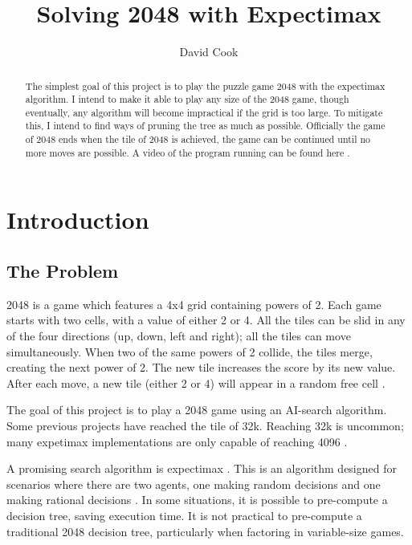 \documentclass{article}
\title{Solving 2048 with Expectimax}
\author{David Cook}
\begin{document}
\maketitle

\tableofcontents
\newpage
\begin{abstract}
The simplest goal of this project is to play the puzzle game 2048 with the expectimax algorithm. I intend to make it able to play any size of the 2048 game, though eventually, any algorithm will become impractical if the grid is too large. To mitigate this, I intend to find ways of pruning the tree as much as possible. Officially the game of 2048 ends when the tile of 2048 is achieved, the game can be continued until no more moves are possible.
A video of the program running can be found here \cite{video}.
\end{abstract}
\section{Introduction}
\label{sec:intro}
\subsection{The Problem}
\label{subsec:problem}
2048 is a game which features a 4x4 grid containing powers of 2. Each game starts with two cells, with a value of either 2 or 4.
All the tiles can be slid in any of the four directions (up, down, left and right); all the tiles can move simultaneously. When two of the same powers of 2 collide, the tiles merge, creating the next power of 2. The new tile increases the score by its new value. After each move, a new tile (either 2 or 4) will appear in a random free cell \cite{game2048}.

The goal of this project is to play a 2048 game using an AI-search algorithm. Some previous projects have reached the tile of 32k\cite{_16k2048ai}. Reaching 32k is uncommon; many expetimax implementations are only capable of reaching 4096 \cite{aiplays2048}\cite{expectimax2048}. 

A promising search algorithm is expectimax \cite{aiplays2048}. This is an algorithm designed for scenarios where there are two agents, one making random decisions and one making rational decisions \cite[~p.200]{russell2010artificial}. In some situations, it is possible to pre-compute a decision tree, saving execution time.
It is not practical to pre-compute a traditional 2048 decision tree, particularly when factoring in variable-size games.
\end{document}
